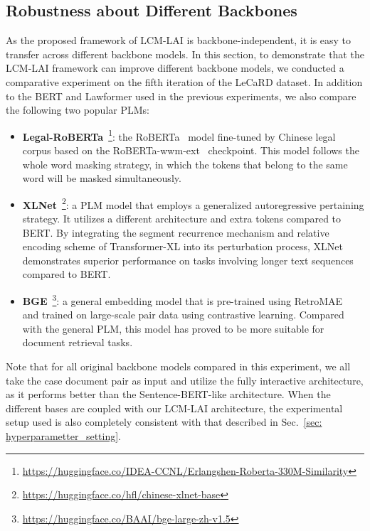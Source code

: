 \subsection{Robustness about Different Backbones}

As the proposed framework of LCM-LAI is backbone-independent, it is easy to transfer across different backbone models.
In this section, to demonstrate that the LCM-LAI framework can improve different backbone models, we conducted a comparative experiment on the fifth iteration of the LeCaRD dataset.
In addition to the BERT and Lawformer used in the previous experiments, we also compare the following two popular PLMs:

\begin{itemize}
\item \textbf{Legal-RoBERTa}~\cite{xiao2021Lawformer}\footnote{\url{https://huggingface.co/IDEA-CCNL/Erlangshen-Roberta-330M-Similarity}}: the RoBERTa~\cite{liu2019roberta} model fine-tuned by Chinese legal corpus based on the RoBERTa-wwm-ext~\cite{cui2021pre} checkpoint. 
This model follows the whole word masking strategy, in which the tokens that
belong to the same word will be masked simultaneously.

\item \textbf{XLNet}~\cite{NEURIPS@XL_Net}\footnote{\url{https://huggingface.co/hfl/chinese-xlnet-base}}:
a PLM model that employs a generalized autoregressive pertaining strategy. 
It utilizes a different architecture and extra tokens compared to BERT.
By integrating the segment recurrence mechanism and relative encoding scheme of Transformer-XL into its perturbation process, XLNet demonstrates superior performance on tasks involving longer text sequences compared to BERT.

\item \textbf{BGE}~\cite{xiao2023BGE}\footnote{\url{https://huggingface.co/BAAI/bge-large-zh-v1.5}}: 
a general embedding model that is pre-trained using RetroMAE~\cite{xiao2022retromae} and trained on large-scale pair data using contrastive learning.
Compared with the general PLM, this model has proved to be more suitable for document retrieval tasks.


\end{itemize}
Note that for all original backbone models compared in this experiment, we all take the case document pair as input and utilize the fully interactive architecture, as it performs better than the Sentence-BERT-like architecture.
When the different bases are coupled with our LCM-LAI architecture, the experimental setup used is also completely consistent with that described in Sec.~\ref{sec: hyperparametter_setting}.

